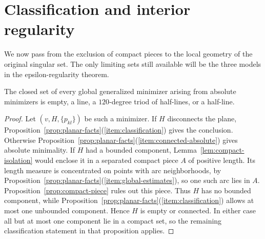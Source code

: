 \section{Classification and interior regularity}
\label{sec:assembly}

We now pass from the exclusion of compact pieces to the local geometry of the
original singular set.  The only limiting sets still available will be the
three models in the epsilon-regularity theorem.

\begin{corollary}
\label{cor:classification}
The closed set of every global generalized minimizer arising from absolute
minimizers is empty, a line, a $120$-degree triod of half-lines, or a half-line.
\end{corollary}

\begin{proof}
Let $(v,H,\{p_{kl}\})$ be such a minimizer.  If $H$ disconnects the plane,
Proposition~\ref{prop:planar-facts}(\ref{item:classification}) gives the
conclusion.  Otherwise Proposition~\ref{prop:planar-facts}(\ref{item:connected-absolute})
gives absolute minimality.  If $H$ had a bounded component,
Lemma~\ref{lem:compact-isolation} would enclose it in a separated compact
piece $A$ of positive length.  Its length measure is concentrated on points
with arc neighborhoods, by
Proposition~\ref{prop:planar-facts}(\ref{item:global-estimates}), so one such
arc lies in $A$.  Proposition~\ref{prop:compact-piece} rules out this piece.
Thus $H$ has no bounded component, while
Proposition~\ref{prop:planar-facts}(\ref{item:classification}) allows at most
one unbounded component.  Hence $H$ is empty or connected.  In either case all but
at most one component lie in a compact set, so the remaining classification
statement in that proposition applies.
\end{proof}

